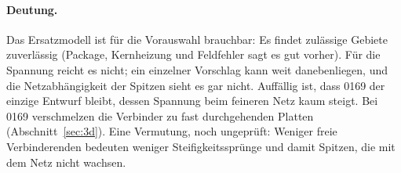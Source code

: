 \paragraph{Deutung.} Das Ersatzmodell ist für die Vorauswahl brauchbar: Es findet zulässige Gebiete zuverlässig
(Package, Kernheizung und Feldfehler sagt es gut vorher). Für die Spannung reicht es nicht; ein einzelner Vorschlag
kann weit danebenliegen, und die Netzabhängigkeit der Spitzen sieht es gar nicht. Auffällig ist, dass 0169 der
einzige Entwurf bleibt, dessen Spannung beim feineren Netz kaum steigt. Bei 0169 verschmelzen die Verbinder zu fast
durchgehenden Platten (Abschnitt~\ref{sec:3d}). Eine Vermutung, noch ungeprüft: Weniger freie Verbinderenden
bedeuten weniger Steifigkeitssprünge und damit Spitzen, die mit dem Netz nicht wachsen.
